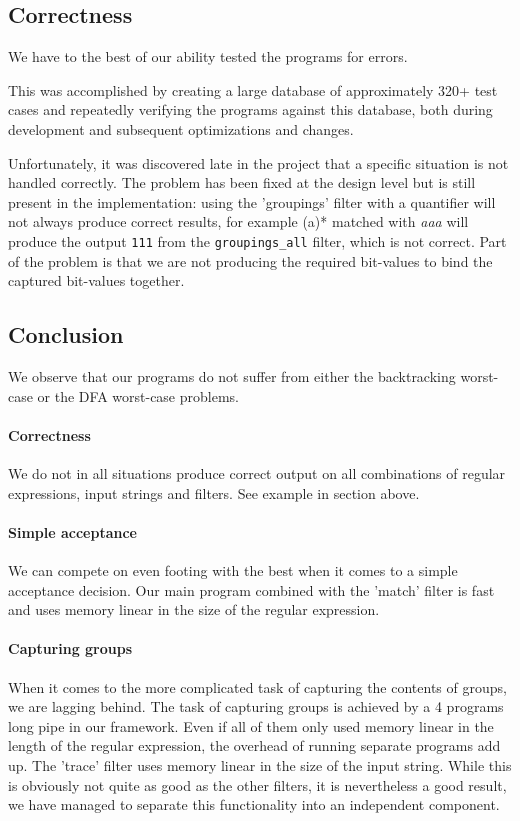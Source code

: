 \subsection{Correctness}

We have to the best of our ability tested the programs for errors. 

This was accomplished by creating a large database of approximately 320+ test cases and repeatedly verifying the programs against this database, both during development and subsequent optimizations and changes. 

Unfortunately, it was discovered late in the project that a specific situation is not handled correctly. The problem has been fixed at the design level but is still present in the implementation: using the 'groupings' filter with a quantifier will not always
produce correct results, for example \textsf{(a)*} matched with
\textsl{aaa} will produce the output \texttt{111} from the
\lstinline{groupings_all} filter, which is not correct. Part of the
problem is that we are not producing the required bit-values to bind
the captured bit-values together.

\subsection{Conclusion}

We observe that our programs do not suffer from either the
backtracking worst-case or the DFA worst-case problems.

\paragraph{Correctness} We do not in all situations produce correct
output on all combinations of regular expressions, input strings and
filters. See example in section above.

\paragraph{Simple acceptance} We can compete on even footing with the
best when it comes to a simple acceptance decision. Our main program
combined with the 'match' filter is fast and uses memory linear in the
size of the regular expression.

\paragraph{Capturing groups} When it comes to the more complicated
task of capturing the contents of groups, we are lagging behind. The
task of capturing groups is achieved by a 4 programs long pipe in our
framework. Even if all of them only used memory linear in the length
of the regular expression, the overhead of running separate programs
add up.  The 'trace' filter uses memory linear in the size of the
input string. While this is obviously not quite as good as the other
filters, it is nevertheless a good result, we have managed to separate
this functionality into an independent component.

